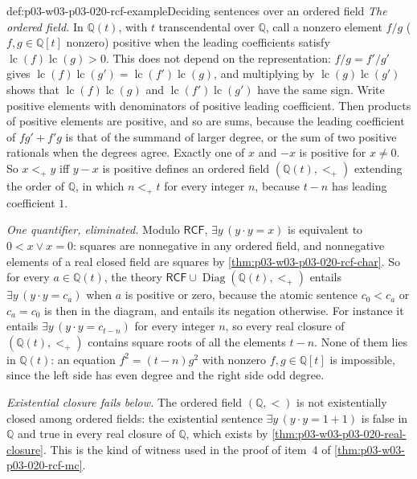 \begin{hbexample}{def:p03-w03-p03-020-rcf-example}{Deciding sentences over an ordered field}
\emph{The ordered field.} In \(\mathbb Q(t)\), with \(t\) transcendental
over \(\mathbb Q\), call a nonzero element \(f/g\) (\(f,g\in\mathbb Q[t]\)
nonzero) positive when the leading coefficients satisfy
\(\operatorname{lc}(f)\operatorname{lc}(g)>0\). This does not depend on the
representation: \(f/g=f'/g'\) gives
\(\operatorname{lc}(f)\operatorname{lc}(g')=\operatorname{lc}(f')\operatorname{lc}(g)\),
and multiplying by \(\operatorname{lc}(g)\operatorname{lc}(g')\) shows that
\(\operatorname{lc}(f)\operatorname{lc}(g)\) and
\(\operatorname{lc}(f')\operatorname{lc}(g')\) have the same sign. Write
positive elements with denominators of positive leading coefficient. Then
products of positive elements are positive, and so are sums, because the
leading coefficient of \(fg'+f'g\) is that of the summand of larger degree,
or the sum of two positive rationals when the degrees agree. Exactly one of
\(x\) and \(-x\) is positive for \(x\ne0\). So \(x<_+y\) iff \(y-x\) is
positive defines an ordered field \((\mathbb Q(t),<_+)\) extending the order
of \(\mathbb Q\), in which \(n<_+t\) for every integer \(n\), because
\(t-n\) has leading coefficient \(1\).

\emph{One quantifier, eliminated.} Modulo \(\mathsf{RCF}\),
\(\exists y\,(y\mathbin{\cdot}y=x)\) is equivalent to \(0<x\lor x=0\):
squares are nonnegative in any ordered field, and nonnegative elements of a
real closed field are squares by
\cref{thm:p03-w03-p03-020-rcf-char}. So for every
\(a\in\mathbb Q(t)\), the theory
\(\mathsf{RCF}\cup\operatorname{Diag}(\mathbb Q(t),<_+)\) entails
\(\exists y\,(y\mathbin{\cdot}y=c_a)\) when \(a\) is positive or zero,
because the atomic sentence \(c_0<c_a\) or \(c_a=c_0\) is then in the
diagram, and entails its negation otherwise. For instance it entails
\(\exists y\,(y\mathbin{\cdot}y=c_{t-n})\) for every integer \(n\), so every
real closure of \((\mathbb Q(t),<_+)\) contains square roots of all the
elements \(t-n\). None of them lies in \(\mathbb Q(t)\): an equation
\(f^2=(t-n)g^2\) with nonzero \(f,g\in\mathbb Q[t]\) is impossible, since
the left side has even degree and the right side odd degree.

\emph{Existential closure fails below.} The ordered field
\((\mathbb Q,<)\) is not existentially closed among ordered fields: the
existential sentence \(\exists y\,(y\mathbin{\cdot}y=1+1)\) is false in
\(\mathbb Q\) and true in every real closure of \(\mathbb Q\), which exists by
\cref{thm:p03-w03-p03-020-real-closure}. This is the kind of witness used in
the proof of item~4 of \cref{thm:p03-w03-p03-020-rcf-mc}.
\end{hbexample}

